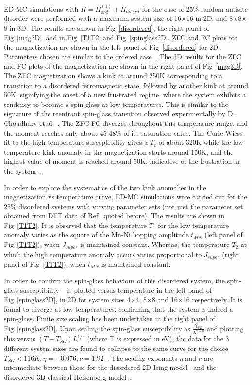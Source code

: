 \documentclass[english,aps,prb,twocolumn,showpacs]{revtex4-1}
\begin{document}
     ED-MC simulations with $H=H^{(1)}_{ord}+H_{disord}$ for the case of 25$\%$ random antisite disorder were
 performed with a maximum system size of 16$\times$16 in 2D, and 8$\times$8$\times$8 in 3D. The results are
    shown in Fig~\ref{disordered}, the right panel of Fig~\ref{mag3D}, and in Fig~\ref{T1T2} and Fig~\ref{spinglass2D}.
 ZFC and FC plots for the magnetization are shown in the left panel of Fig~\ref{disordered} for 2D .
 Parameters chosen are similar to the ordered case~\cite{disordparam}. The 3D results for the ZFC and FC plots
 of the magnetization are shown in the right panel of Fig~\ref{mag3D}.
 The ZFC magnetization shows a kink at around 250K corresponding to a transition to a disordered ferromagnetic state,
  followed by another kink at  around 50K, signifying the onset of a new frustrated regime, 
 where the system exhibits a tendency to become a spin-glass at low temperatures.
 This is similar to the signature of the reentrant spin-glass transition observed
 experimentally by D. Choudhury et.al.~\cite{debraj}. The ZFC-FC diverges throughout this temperature range, 
and the moment reaches only about 45-48$\%$ of its saturation value. 
The Curie Wiess fit to the high temperature susceptibility gives a $T_{c}$ of  about 320K 
 while the low temperature kink anomaly in the magnetization
  starts around 150K, and the highest value of moment is reached around 50K, indicative of the frustration in the
 system~\cite{frustration}.
 
                         In order to explore the systematics of the two kink anomalies 
in the magnetization vs temperature curve, ED-MC simulations were carried
 out for the 25$\%$ disordered systems with varying parameter sets 
(not just the parameter set obtained from DFT data of Ref~\cite{Tanusri} quoted before). 
 The results are shown in Fig~\ref{T1T2}. 
 It is observed that the temperature $T_{1}$ for the low temperature anomaly  
 varies as the square of the Mn-Ni hopping amplitude $t_{MN}$ (left panel of Fig~\ref{T1T2}),
 when $J_{super}$ is maintained constant.
 Whereas, the temperature $T_{2}$
 at which the high temperature anomaly occurs varies proportional to $J_{super}$ 
 (right panel of  Fig~\ref{T1T2}), when $t_{MN}$ is maintained constant.


 In order to confirm the spin-glass behaviour of this disordered system,
 the spin-glass susceptibility
~\cite{Fischer,BhattYoung} is plotted versus temperature in the left panel of Fig~\ref{spinglass2D}, 
in 2D for system sizes 4$\times$4, 8$\times$8 and 
16$\times$16 respectively. It is found to diverge at low temperatures, confirming that the system is indeed a spin-glass. Finite size scaling has been undertaken in the right panel of Fig~\ref{spinglass2D}. 
Upon scaling the spin-glass susceptibility as 
 $\frac{\chi_{SG}}{L^{2-\eta}}$ and plotting this versus $(T-T_{SG})L^{1/\nu}$ (where T is expressed in eV),
 the data for the 3 different system sizes are found to collapse to the same curve 
 for the choice $T_{SG}<116K, \eta=-0.076,\nu=1.92$~\cite{TSG,elphasetrans,Kawamura,YoungHeisenberg}.
 The scaling exponents $\eta$ and $\nu$ are intermediate between those for the disordered 2D Ising model~\cite{BhattYoung}
 and the disordered 3D classical Heisenberg model~\cite{YoungHeisenberg}.
\end{document}
